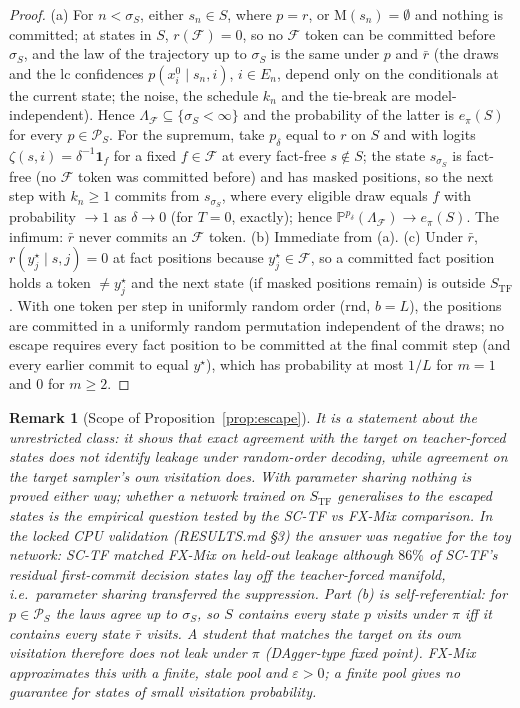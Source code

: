 \documentclass[11pt]{article}
\newtheorem{remark}{Remark}
\newcommand{\F}{\mathcal{F}}
\newcommand{\Prob}{\mathbb{P}}
\newcommand{\M}{\mathrm{M}}
\begin{document}
\begin{proof}
(a) For $n<\sigma_S$, either $s_n\in S$, where $p=r$, or $\M(s_n)=\emptyset$ and nothing is committed; at states in $S$, $r(\F)=0$, so no $\F$ token can be committed before $\sigma_S$,
and the law of the trajectory up to $\sigma_S$ is the same under $p$ and $\bar r$ (the draws and the lc confidences $p(x^0_i\mid s_n,i)$, $i\in E_n$,
depend only on the conditionals at the current state; the noise, the schedule $k_n$ and the tie-break are model-independent). Hence $\Lambda_\F\subseteq\{\sigma_S<\infty\}$ and the probability of the
latter is $e_\pi(S)$ for every $p\in\mathcal{P}_S$. For the supremum, take $p_\delta$ equal to $r$ on $S$ and with logits
$\zeta(s,i)=\delta^{-1}\mathbf{1}_{f}$ for a fixed $f\in\F$ at every fact-free $s\notin S$; the state $s_{\sigma_S}$ is fact-free
(no $\F$ token was committed before) and has masked positions, so the next step with $k_n\ge1$ commits from $s_{\sigma_S}$, where
every eligible draw equals $f$ with probability $\to1$ as $\delta\to0$ (for $T=0$, exactly); hence
$\Prob^{p_\delta}(\Lambda_\F)\to e_\pi(S)$. The infimum: $\bar r$ never commits an $\F$ token.
(b) Immediate from (a).
(c) Under $\bar r$, $r(y^\star_j\mid s,j)=0$ at fact positions because $y^\star_j\in\F$, so a committed fact position holds a
token $\ne y^\star_j$ and the next state (if masked positions remain) is outside $S_{\mathrm{TF}}$. With one token per step in
uniformly random order (rnd, $b=L$), the positions are committed in a uniformly random permutation independent of the draws;
no escape requires every fact position to be committed at the final commit step (and every earlier commit to equal $y^\star$), which has probability at most $1/L$ for $m=1$ and $0$ for
$m\ge2$.
\end{proof}
\begin{remark}[Scope of Proposition~\ref{prop:escape}]
It is a statement about the unrestricted class: it shows that exact agreement with the target on teacher-forced states does
not \emph{identify} leakage under random-order decoding, while agreement on the target sampler's own visitation does. With
parameter sharing nothing is proved either way; whether a network trained on $S_{\mathrm{TF}}$ generalises to the escaped
states is the empirical question tested by the SC-TF vs FX-Mix comparison. In the locked CPU validation (RESULTS.md \S3) the answer
was negative for the toy network: SC-TF matched FX-Mix on held-out leakage although $86\%$ of SC-TF's residual first-commit
decision states lay off the teacher-forced manifold, i.e.\ parameter sharing transferred the suppression. Part (b) is self-referential: for $p\in\mathcal{P}_S$ the laws agree up to $\sigma_S$, so $S$ contains every state $p$ visits under
$\pi$ iff it contains every state $\bar r$ visits. A student that matches the target on its \emph{own} visitation therefore does not leak
under $\pi$ (DAgger-type fixed point). FX-Mix approximates this with a finite, stale pool and $\varepsilon>0$; a finite pool gives no
guarantee for states of small visitation probability.
\end{remark}
\end{document}
